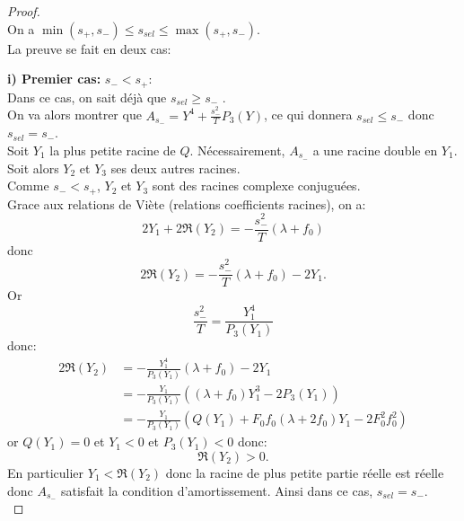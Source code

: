 \documentclass[11pt]{article}
\begin{document}
\begin{proof} \ \\
On a $ \min(s_+,s_-) \leq s_{sel} \leq \max(s_+,s_-)$.\\
La preuve se fait en deux cas:

\textbf{i) Premier cas:} $s_- < s_+$:\\
Dans ce cas, on sait déjà que $s_{sel} \geq s_-$ .\\
On va alors montrer que $A_{s_-} = Y^4+ \frac{s_-^2}{T}P_3(Y)$, ce qui donnera $s_{sel} \leq s_-$ donc $s_{sel} = s_-$.\\
Soit $Y_{1}$ la plus petite racine de $Q$. Nécessairement, $A_{s_-}$ a une racine double en $Y_1$. \\
Soit alors $Y_2$ et $Y_{3}$ ses deux autres racines. \\
Comme $s_-<s_+$, $Y_2$ et $Y_3$ sont des racines complexe conjuguées.\\ Grace aux relations de Viète (relations coefficients racines), on a:\\
\begin{equation}
	2Y_1 + 2\Re(Y_2) = - \frac{s_-^2}{T}(\lambda + f_0)	
\end{equation}
donc \begin{equation}
	2\Re(Y_2) =  - \frac{s_-^2}{T}(\lambda + f_0)	- 2Y_1.
\end{equation}
Or \begin{equation}
	\frac{s_-^2}{T} = \frac{Y_1^4}{P_3(Y_1)}
\end{equation}  
donc: \begin{align*}
	2\Re(Y_2) &=  - \frac{Y_1^4}{P_3(Y_1)}(\lambda + f_0)	- 2Y_1 \\
	&=- \frac{Y_1}{P_3(Y_1)}((\lambda + f_0)Y_1^3 - 2P_3(Y_1))\\
	&=-\frac{Y_1}{P_3(Y_1)}(Q(Y_1)+F_0f_0(\lambda+2f_0)Y_1 - 2F_0^2f_0^2)
\end{align*}
or $Q(Y_1) = 0$ et $Y_1<0$ et $P_3(Y_1)<0$ donc: \begin{equation}
	\Re(Y_2)>0.
\end{equation}
En particulier $Y_1 < \Re(Y_2)$ donc la racine de plus petite partie réelle est réelle donc $A_{s_-}$ satisfait la condition d'amortissement. Ainsi dans ce cas, \underline{$s_{sel} = s_-$}.\\


\end{proof}
\end{document}
